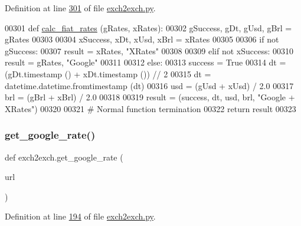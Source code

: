 Definition at line \hyperlink{exch2exch_8py_source_l00301}{301} of file \hyperlink{exch2exch_8py_source}{exch2exch.\+py}.


\begin{DoxyCode}
00301 \textcolor{keyword}{def }\hyperlink{namespaceexch2exch_a2f3337121882596d0644f2d48ffb870c}{calc\_fiat\_rates} (gRates, xRates):
00302     gSuccess, gDt, gUsd, gBrl = gRates 
00303     
00304     xSuccess, xDt, xUsd, xBrl = xRates
00305     
00306     \textcolor{keywordflow}{if} \textcolor{keywordflow}{not} gSuccess:
00307         result = xRates, \textcolor{stringliteral}{"XRates"}
00308         
00309     \textcolor{keywordflow}{elif} \textcolor{keywordflow}{not} xSuccess:
00310         result = gRates, \textcolor{stringliteral}{"Google"}
00311         
00312     \textcolor{keywordflow}{else}: 
00313         success = \textcolor{keyword}{True}
00314         dt  = (gDt.timestamp () + xDt.timestamp ()) // 2
00315         dt = datetime.datetime.fromtimestamp (dt)
00316         usd = (gUsd + xUsd) / 2.0
00317         brl = (gBrl + xBrl) / 2.0
00318         
00319         result = (success, dt, usd, brl, \textcolor{stringliteral}{"Google + XRates"})
00320         
00321     \textcolor{comment}{# Normal function termination}
00322     \textcolor{keywordflow}{return} result        
00323 
\end{DoxyCode}
\mbox{\label{namespaceexch2exch_a20ad08d045d52bdcb3977eaa8f951622}} 
\subsubsection{\texorpdfstring{get\+\_\+google\+\_\+rate()}{get\_google\_rate()}}
{\footnotesize\ttfamily def exch2exch.\+get\+\_\+google\+\_\+rate (\begin{DoxyParamCaption}\item[{}]{url }\end{DoxyParamCaption})}



Definition at line \hyperlink{exch2exch_8py_source_l00194}{194} of file \hyperlink{exch2exch_8py_source}{exch2exch.\+py}.


